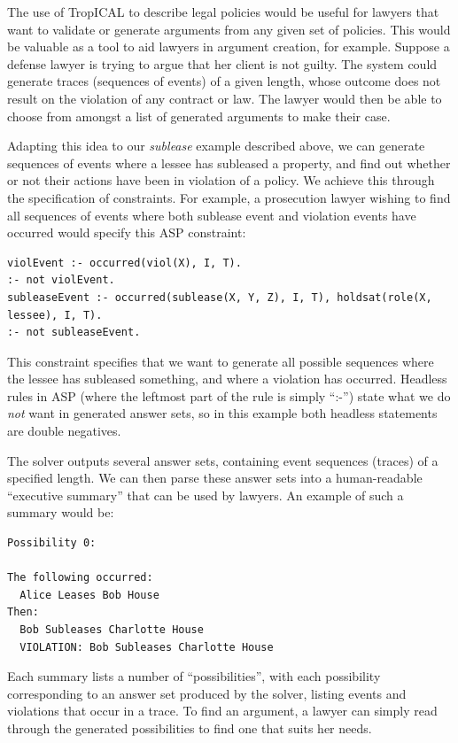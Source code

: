 \documentclass[11pt]{report}
\begin{document}
The use of TropICAL to describe legal policies would be useful for lawyers that
want to validate or generate arguments from any given set of policies. This would be valuable as a tool
to aid lawyers in argument creation, for example.
Suppose a defense lawyer is trying to argue that her client
is not guilty. The system could generate traces (sequences of events) of a
given length, whose outcome does not result on the violation of any contract
or law. The lawyer would then be able to choose from amongst a list of
generated arguments to make their case. 

Adapting this idea to our \emph{sublease} example described above,
we can generate sequences of events where a lessee has
subleased a property, and find out whether or not their actions have been in
violation of a policy. We achieve this through the specification of constraints.
For example, a prosecution lawyer wishing to find all sequences of events where
both sublease event and violation events have occurred would specify this ASP
constraint:

\begin{lstlisting}
violEvent :- occurred(viol(X), I, T).
:- not violEvent.
subleaseEvent :- occurred(sublease(X, Y, Z), I, T), holdsat(role(X, lessee), I, T).
:- not subleaseEvent.
\end{lstlisting}

This constraint specifies that we want to generate all possible sequences where
the lessee has subleased something, and where a violation has occurred. Headless
rules in ASP (where the leftmost part of the rule is simply ``:-'') state what we
do \emph{not} want in generated answer sets, so in this example both headless
statements are double negatives.

The solver outputs several answer sets, containing event sequences (traces) of a
specified length. We can then parse these answer sets into a human-readable
``executive summary'' that can be used by lawyers. An example of such a summary
would be:

\begin{lstlisting}
Possibility 0:

The following occurred:
  Alice Leases Bob House
Then:
  Bob Subleases Charlotte House
  VIOLATION: Bob Subleases Charlotte House
\end{lstlisting}

Each summary lists a number of ``possibilities'', with each possibility
corresponding to an answer set produced by the solver, listing events and violations that occur
in a trace. To find an argument, a lawyer can simply read through the generated
possibilities to find one that suits her needs.
\end{document}
